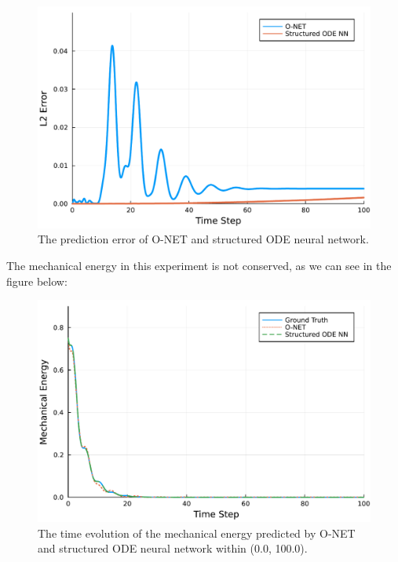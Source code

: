 \documentclass[
	parskip, 			   %
	twoside, 			   %
	DIV=14, 			   %
	BCOR=15.0mm, 		   %
	headsepline, 		   %
	open=right, 		   %
	captions=tableheading, %
	bibliography=totoc,    %
	numbers=noenddot       %
]{scrreprt}
\begin{document}
\begin{figure}[h!]
    \centering
    \includegraphics[scale=0.5]{figures/prediction_error_idho_O_NET_and_structured_ODE_NN.pdf}
    \caption{The prediction error of O-NET and structured ODE neural network.}
    \label{fig:prediction_error_idho_O_NET_and_structured_ODE_NN}
\end{figure}

The mechanical energy in this experiment is not conserved, as we can see in the figure below:

\clearpage
\begin{figure}[h!]
    \centering
    \includegraphics[scale=0.5]{figures/Hamiltonian_evolution_idho_O_NET_and_structured_ODE_NN.pdf}
    \caption{The time evolution of the mechanical energy predicted by O-NET and structured ODE neural network within (0.0, 100.0).}
    \label{fig:Hamiltonian_evolution_idho_O_NET_and_structured_ODE_NN}
\end{figure}
\end{document}
